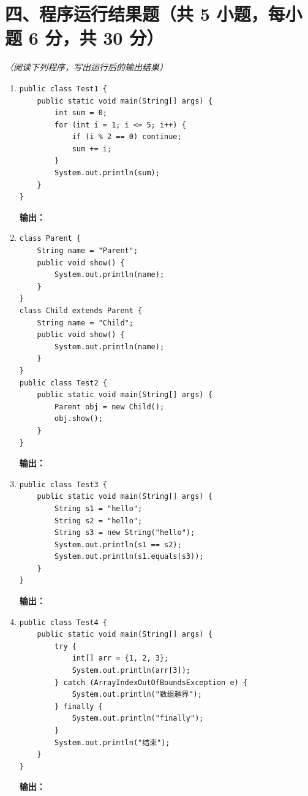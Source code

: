 \documentclass[a3paper, landscape, 11pt, twocolumn]{article}
\begin{document}
\section*{四、程序运行结果题（共 5 小题，每小题 6 分，共 30 分）}
\textit{（阅读下列程序，写出运行后的输出结果）}

\begin{enumerate}[label=\arabic*., itemsep=1em]
	\item
	      \begin{lstlisting}[style=JavaExam]
public class Test1 {
    public static void main(String[] args) {
        int sum = 0;
        for (int i = 1; i <= 5; i++) {
            if (i % 2 == 0) continue;
            sum += i;
        }
        System.out.println(sum);
    }
}
\end{lstlisting}
	      \textbf{输出：}\underline{\hspace{6cm}}

	\item
	      \begin{lstlisting}[style=JavaExam]
class Parent {
    String name = "Parent";
    public void show() {
        System.out.println(name);
    }
}
class Child extends Parent {
    String name = "Child";
    public void show() {
        System.out.println(name);
    }
}
public class Test2 {
    public static void main(String[] args) {
        Parent obj = new Child();
        obj.show();
    }
}
\end{lstlisting}
	      \textbf{输出：}\underline{\hspace{6cm}}

	\item
	      \begin{lstlisting}[style=JavaExam]
public class Test3 {
    public static void main(String[] args) {
        String s1 = "hello";
        String s2 = "hello";
        String s3 = new String("hello");
        System.out.println(s1 == s2);
        System.out.println(s1.equals(s3));
    }
}
\end{lstlisting}
	      \textbf{输出：}\underline{\hspace{6cm}}

	\item
	      \begin{lstlisting}[style=JavaExam]
public class Test4 {
    public static void main(String[] args) {
        try {
            int[] arr = {1, 2, 3};
            System.out.println(arr[3]);
        } catch (ArrayIndexOutOfBoundsException e) {
            System.out.println("数组越界");
        } finally {
            System.out.println("finally");
        }
        System.out.println("结束");
    }
}
\end{lstlisting}
	      \textbf{输出：}\underline{\hspace{6cm}}


\end{enumerate}
\end{document}

